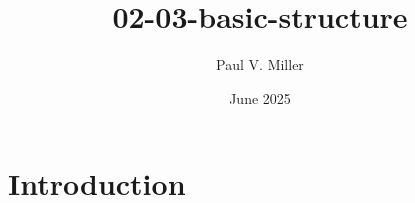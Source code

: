 \documentclass[12pt, twocolumn]{article}
\title{02-03-basic-structure}
\author{Paul V. Miller}
\date{June 2025}
\begin{document}
\maketitle

\section{Introduction}

\lipsum[1-3]    %
\end{document}
